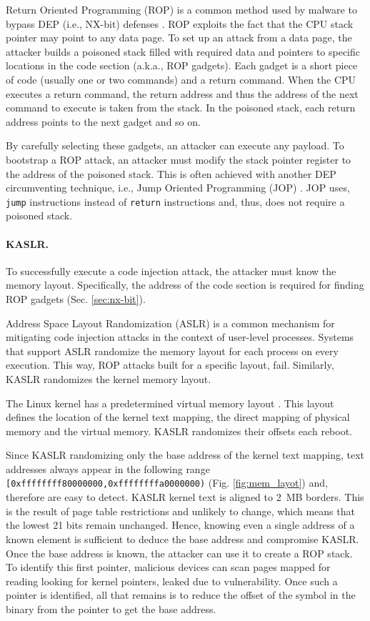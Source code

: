 Return Oriented Programming (ROP) is a common method used by malware to bypass DEP (i.e., NX-bit) defenses \cite{RBSS12}. ROP exploits the fact that the CPU stack pointer may point to any data page. To set up an attack from a data page, the attacker builds a poisoned stack filled with required data and pointers to specific locations in the code section (a.k.a., ROP gadgets). Each gadget is a short piece of code (usually one or two commands) and a return command. When the CPU executes a return command, the return address and thus the address of the next command to execute is taken from the stack. In the poisoned stack, each return address points to the next gadget and so on. 
 
By carefully selecting these gadgets, an attacker can execute any payload. To bootstrap a ROP attack, an attacker must modify the stack pointer register to the address of the poisoned stack. This is often achieved with another DEP circumventing technique, i.e., Jump Oriented Programming (JOP) \cite{BJFL11}. JOP uses, \texttt{jump} instructions instead of \texttt{return} instructions and, thus, does not require a poisoned stack.

\paragraph{KASLR.}\label{sec:kaslr}

To successfully execute a code injection attack, the attacker must know the memory layout. Specifically, the address of the code section is required for finding ROP gadgets (Sec. \ref{sec:nx-bit}). 

Address Space Layout Randomization (ASLR) is a common mechanism for mitigating code injection attacks in the context of user-level processes. Systems that support ASLR randomize the memory layout for each process on every execution. This way, ROP attacks built for a specific layout, fail. Similarly, KASLR \cite{kalsr} randomizes the kernel memory layout.

The Linux kernel has a predetermined virtual memory layout \cite{mem_layout}. This layout defines the location of the kernel text mapping, the direct mapping of physical memory and the virtual memory. KASLR randomizes their offsets each reboot.

Since KASLR randomizing only the base address of the kernel text mapping, text addresses always appear in the following range \texttt{[0xffffffff80000000,0xffffffffa0000000)} (Fig. \ref{fig:mem_layot}) and, therefore are easy to detect. KASLR kernel text is aligned to 2~MB borders. This is the result of page table restrictions and unlikely to change, which means that the lowest 21 bits remain unchanged. Hence, knowing even a single address of a known element is sufficient to deduce the base address and compromise KASLR. Once the base address is known, the attacker can use it to create a ROP stack. To identify this first pointer, malicious devices can scan pages mapped for reading looking for kernel pointers, leaked due to \subpage{} vulnerability. Once such a pointer is identified, all that remains is to reduce the offset of the symbol in the binary from the pointer to get the base address.

